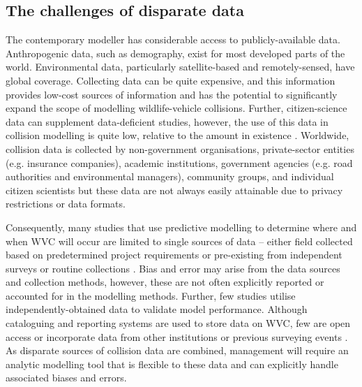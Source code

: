\subsection{The challenges of disparate data}
%
The contemporary modeller has considerable access to publicly-available data. Anthropogenic data, such as demography, exist for most developed parts of the world. Environmental data, particularly satellite-based and remotely-sensed, have global coverage. Collecting data can be quite expensive, and this information provides low-cost sources of information and has the potential to significantly expand the scope of modelling wildlife-vehicle collisions. Further, citizen-science data can supplement data-deficient studies, however, the use of this data in collision modelling is quite low, relative to the amount in existence \citep[but see][]{paul14}. Worldwide, collision data is collected by non-government organisations, private-sector entities (e.g. insurance companies), academic institutions, government agencies (e.g. road authorities and environmental managers), community groups, and individual citizen scientists but these data are not always easily attainable due to privacy restrictions or data formats. 

Consequently, many studies that use predictive modelling to determine where and when WVC will occur are limited to single sources of data -- either field collected based on predetermined project requirements \citep[e.g.][]{lang09,roge09} or pre-existing from independent surveys or routine collections \citep[e.g.][]{hoth12,malo04}. Bias and error may arise from the data sources and collection methods, however, these are not often explicitly reported or accounted for in the modelling methods. Further, few studies utilise independently-obtained data to validate model performance. Although cataloguing and reporting systems are used to store data on WVC, few are open access or incorporate data from other institutions or previous surveying events \citep[but see][]{shil15b}. As disparate sources of collision data are combined, management will require an analytic modelling tool that is flexible to these data and can explicitly handle associated biases and errors.

